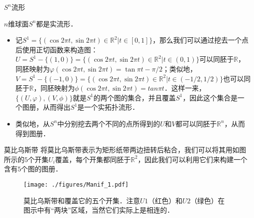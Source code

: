 \begin{example}{$S^n$流形}

$n$维球面$S^n$都是实流形．
\begin{itemize}
\item 记$S^1=\{(\cos{2\pi t},\sin{2\pi t})\in\mathbb{R}^2|t\in[0, 1]\}$，那么我们可以通过挖去一个点后使用正切函数来构造图：$U=S^1-\{(1,0)\}=\{(\cos{2\pi t},\sin{2\pi t})\in\mathbb{R}^2|t\in(0, 1)\}$可以同胚于$\mathbb{R}$，同胚映射为$\varphi(\cos{2\pi t},\sin{2\pi t})=\tan{\pi t-\pi/2}$；类似地，$V=S^1-\{(-1, 0)\}=\{(\cos{2\pi t},\sin{2\pi t})\in\mathbb{R}^2|t\in(-1/2, 1/2)\}$也可以同胚于$\mathbb{R}$，同胚映射为$\phi(\cos{2\pi t},\sin{2\pi t})=tan{\pi t}$．这样一来，$\{(U, \varphi), (V, \phi)\}$就是$S^1$的两个图的集合，并且覆盖$S^1$，因此这个集合是一个图册，从而得出$S^1$是一个实拓扑流形．
\item 类似地，从$S^n$中分别挖去两个不同的点所得到的$U$和$V$都可以同胚于$\mathbb{R}^n$，从而得到图册．


\end{itemize}

\end{example}

\begin{example}{莫比乌斯带}
将莫比乌斯带表示为矩形纸带两边扭转后粘合，我们可以将其用如图所示的$5$个开集$U_i$覆盖，每个开集都同胚于$\mathbb{R}^2$，因此我们可以利用它们来构建一个含有$5$个图的图册．
\begin{figure}[ht]
\centering
\texttt{[image: ./figures/Manif\_1.pdf]}
\caption{莫比乌斯带和覆盖它的五个开集．注意$U1$（红色）和$U2$（绿色）在图示中有“两块”区域，当然它们实际上是相连的．} \label{Manif_fig1}
\end{figure}
\end{example}


